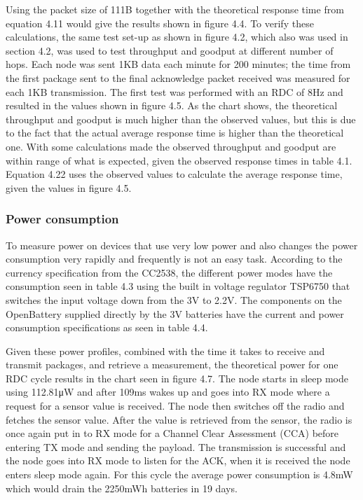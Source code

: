 Using the packet size of 111B together with the theoretical response time from equation 4.11 would give the results shown in figure 4.4.
To verify these calculations,
	the same test set-up as shown in figure 4.2,
	which also was used in section 4.2,
	was used to test throughput and goodput at different number of hops.
Each node was sent 1KB data each minute for 200 minutes;
	the time from the first package sent to the final acknowledge packet received was measured for each 1KB transmission.
The first test was performed with an RDC of 8Hz and resulted in the values shown in figure 4.5.
As the chart shows,
	the theoretical throughput and goodput is much higher than the observed values,
	but this is due to the fact that the actual average response time is higher than the theoretical one.
With some calculations made the observed throughput and goodput are within range of what is expected,
	given the observed response times in table 4.1.
Equation 4.22 uses the observed values to calculate the average response time,
	given the values in figure 4.5.

\subsubsection{Power consumption}

To measure power on devices that use very low power and also changes the power consumption very rapidly and frequently is not an easy task.
According to the currency specification from the CC2538,
	the different power modes have the consumption seen in table 4.3 using the built in voltage regulator TSP6750 that switches the input voltage down from the 3V to 2.2V.
The components on the OpenBattery supplied directly by the 3V batteries have the current and power consumption specifications as seen in table 4.4.


Given these power profiles,
	combined with the time it takes to receive and transmit packages,
	and retrieve a measurement,
	the theoretical power for one RDC cycle results in the chart seen in figure 4.7.
The node starts in sleep mode using 112.81μW and after 109ms wakes up and goes into RX mode where a request for a sensor value is received.
The node then switches off the radio and fetches the sensor value.
After the value is retrieved from the sensor,
	the radio is once again put in to RX mode for a Channel Clear Assessment (CCA) before entering TX mode and sending the payload.
The transmission is successful and the node goes into RX mode to listen for the ACK,
	when it is received the node enters sleep mode again.
For this cycle the average power consumption is 4.8mW which would drain the 2250mWh batteries in 19 days.

